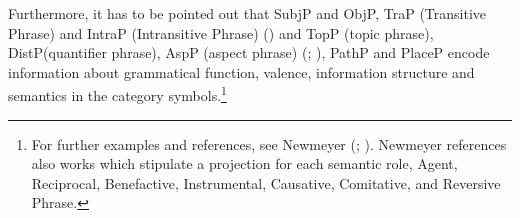 Furthermore, it has to be pointed out that SubjP and ObjP, TraP (Transitive
Phrase) and IntraP (Intransitive Phrase) (\citealp[]{Karimi-Doostan2005a}) and
TopP (topic phrase), DistP\linebreak (quantifier
phrase), AspP (aspect phrase) (\citealp[]{EKiss2003a-u}; \citealp[]{Karimi2005a}), PathP and PlaceP
\citep[]{Svenonius2004a-u} encode information about grammatical function, valence,
information structure and semantics in the category symbols.\footnote{%
	For further examples and references, see Newmeyer (\citeyear[]{Newmeyer2004b};
  \citeyear[]{Newmeyer2005a}). Newmeyer references also works which stipulate a projection
  for each semantic role, \eg Agent, Reciprocal, Benefactive, Instrumental, Causative,
  Comitative, and Reversive Phrase.
}
%
